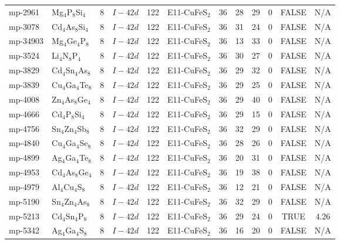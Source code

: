 {\begin{longtable}{llcccccccccc}
    mp-2961 & Mg$_{4}$P$_{8}$Si$_{4}$ & 8     & $I-42d$ & 122   & E11-CuFeS$_{2}$ & 36    & 28    & 29    & 0     & FALSE & N/A \\
    mp-3078 & Cd$_{4}$As$_{8}$Si$_{4}$ & 8     & $I-42d$ & 122   & E11-CuFeS$_{2}$ & 36    & 31    & 24    & 0     & FALSE & N/A \\
    mp-34903 & Mg$_{4}$Ge$_{4}$P$_{8}$ & 8     & $I-42d$ & 122   & E11-CuFeS$_{2}$ & 36    & 13    & 33    & 0     & FALSE & N/A \\
    mp-3524 & Li$_{4}$N$_{8}$P$_{4}$ & 8     & $I-42d$ & 122   & E11-CuFeS$_{2}$ & 36    & 30    & 27    & 0     & FALSE & N/A \\
    mp-3829 & Cd$_{4}$Sn$_{4}$As$_{8}$ & 8     & $I-42d$ & 122   & E11-CuFeS$_{2}$ & 36    & 29    & 32    & 0     & FALSE & N/A \\
    mp-3839 & Cu$_{4}$Ga$_{4}$Te$_{8}$ & 8     & $I-42d$ & 122   & E11-CuFeS$_{2}$ & 36    & 29    & 25    & 0     & FALSE & N/A \\
    mp-4008 & Zn$_{4}$As$_{8}$Ge$_{4}$ & 8     & $I-42d$ & 122   & E11-CuFeS$_{2}$ & 36    & 29    & 40    & 0     & FALSE & N/A \\
    mp-4666 & Cd$_{4}$P$_{8}$Si$_{4}$ & 8     & $I-42d$ & 122   & E11-CuFeS$_{2}$ & 36    & 29    & 15    & 0     & FALSE & N/A \\
    mp-4756 & Sn$_{4}$Zn$_{4}$Sb$_{8}$ & 8     & $I-42d$ & 122   & E11-CuFeS$_{2}$ & 36    & 32    & 29    & 0     & FALSE & N/A \\
    mp-4840 & Cu$_{4}$Ga$_{4}$Se$_{8}$ & 8     & $I-42d$ & 122   & E11-CuFeS$_{2}$ & 36    & 28    & 26    & 0     & FALSE & N/A \\
    mp-4899 & Ag$_{4}$Ga$_{4}$Te$_{8}$ & 8     & $I-42d$ & 122   & E11-CuFeS$_{2}$ & 36    & 20    & 31    & 0     & FALSE & N/A \\
    mp-4953 & Cd$_{4}$As$_{8}$Ge$_{4}$ & 8     & $I-42d$ & 122   & E11-CuFeS$_{2}$ & 36    & 19    & 38    & 0     & FALSE & N/A \\
    mp-4979 & Al$_{4}$Cu$_{4}$S$_{8}$ & 8     & $I-42d$ & 122   & E11-CuFeS$_{2}$ & 36    & 12    & 21    & 0     & FALSE & N/A \\
    mp-5190 & Sn$_{4}$Zn$_{4}$As$_{8}$ & 8     & $I-42d$ & 122   & E11-CuFeS$_{2}$ & 36    & 32    & 29    & 0     & FALSE & N/A \\
    mp-5213 & Cd$_{4}$Sn$_{4}$P$_{8}$ & 8     & $I-42d$ & 122   & E11-CuFeS$_{2}$ & 36    & 29    & 24    & 0     & TRUE  & 4.26  \\
    mp-5342 & Ag$_{4}$Ga$_{4}$S$_{8}$ & 8     & $I-42d$ & 122   & E11-CuFeS$_{2}$ & 36    & 16    & 20    & 0     & FALSE & N/A \\

\end{longtable}}
